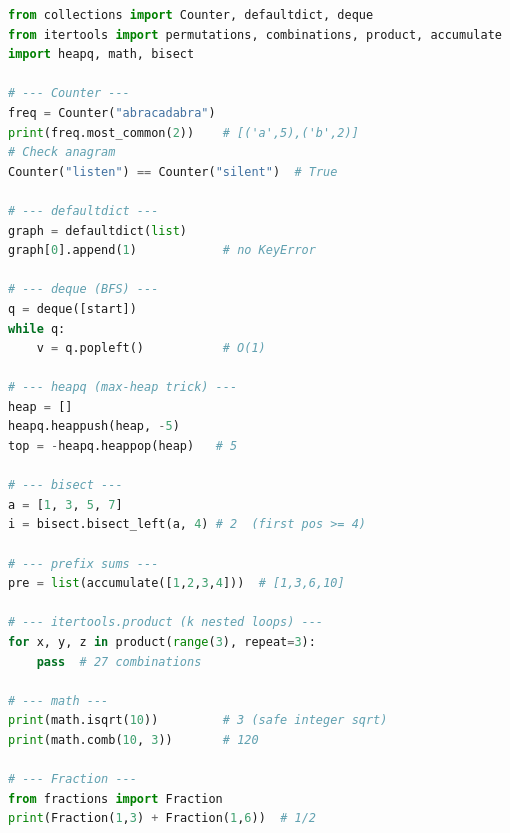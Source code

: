 \begin{lstlisting}[language=Python]
from collections import Counter, defaultdict, deque
from itertools import permutations, combinations, product, accumulate
import heapq, math, bisect

# --- Counter ---
freq = Counter("abracadabra")
print(freq.most_common(2))    # [('a',5),('b',2)]
# Check anagram
Counter("listen") == Counter("silent")  # True

# --- defaultdict ---
graph = defaultdict(list)
graph[0].append(1)            # no KeyError

# --- deque (BFS) ---
q = deque([start])
while q:
    v = q.popleft()           # O(1)

# --- heapq (max-heap trick) ---
heap = []
heapq.heappush(heap, -5)
top = -heapq.heappop(heap)   # 5

# --- bisect ---
a = [1, 3, 5, 7]
i = bisect.bisect_left(a, 4) # 2  (first pos >= 4)

# --- prefix sums ---
pre = list(accumulate([1,2,3,4]))  # [1,3,6,10]

# --- itertools.product (k nested loops) ---
for x, y, z in product(range(3), repeat=3):
    pass  # 27 combinations

# --- math ---
print(math.isqrt(10))         # 3 (safe integer sqrt)
print(math.comb(10, 3))       # 120

# --- Fraction ---
from fractions import Fraction
print(Fraction(1,3) + Fraction(1,6))  # 1/2
\end{lstlisting}